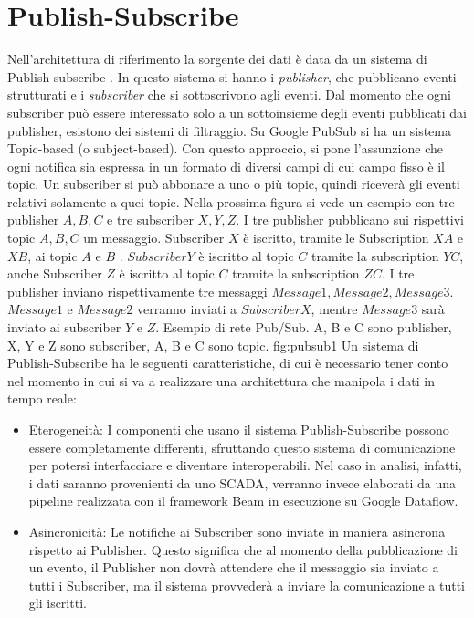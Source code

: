 \section{Publish-Subscribe}\label{pubsub}
Nell’architettura di riferimento la sorgente dei dati è data da un sistema di Publish-subscribe \cite{coulouris_2012}. In questo sistema si hanno i \textit{publisher}, che pubblicano eventi strutturati e i \textit{subscriber} che si sottoscrivono agli eventi. Dal momento che ogni subscriber può essere interessato solo a un sottoinsieme degli eventi pubblicati dai publisher, esistono dei sistemi di filtraggio. Su Google PubSub si ha un sistema Topic-based (o subject-based). Con questo approccio, si pone l’assunzione che ogni notifica sia espressa in un formato di diversi campi di cui campo fisso è il topic. Un subscriber si può abbonare a uno o più topic, quindi riceverà gli eventi relativi solamente a quei topic. Nella prossima figura si vede un esempio con tre publisher $ A, B, C $ e tre subscriber $ X, Y, Z$. I tre publisher pubblicano sui rispettivi topic $  A, B, C $ un messaggio. Subscriber $ X $ è iscritto, tramite le Subscription $ XA $ e $ XB $, ai topic $ A $ e $ B $ . $ Subscriber Y $ è iscritto al topic $ C $ tramite la subscription $ YC $, anche Subscriber $ Z $ è iscritto al topic $ C $ tramite la subscription $ ZC $.
I tre publisher inviano rispettivamente tre messaggi $ Message 1, Message2, Message3 $. $ Message 1 $ e $ Message2 $ verranno inviati a $ Subscriber X $, mentre $ Message 3 $ sarà inviato ai subscriber $ Y $ e $ Z $.
{Esempio di rete Pub/Sub. A, B e C sono publisher, X, Y e Z sono subscriber, A, B e C sono topic.} 
{fig:pubsub1}
Un sistema di Publish-Subscribe ha le seguenti caratteristiche, di cui è necessario tener conto nel momento in cui si va a realizzare una architettura che manipola i dati in tempo reale:
\begin{itemize}
\item Eterogeneità: I componenti che usano il sistema Publish-Subscribe possono essere completamente differenti, sfruttando questo sistema di comunicazione per potersi interfacciare e diventare interoperabili. Nel caso in analisi, infatti, i dati saranno provenienti da uno SCADA, verranno invece elaborati da una pipeline realizzata con il framework Beam in esecuzione su Google Dataflow.
\item Asincronicità: Le notifiche ai Subscriber sono inviate in maniera asincrona rispetto ai Publisher. Questo significa che al momento della pubblicazione di un evento, il Publisher non dovrà attendere che il messaggio sia inviato a tutti i Subscriber, ma il sistema provvederà a inviare la comunicazione a tutti gli iscritti.
\end{itemize}
